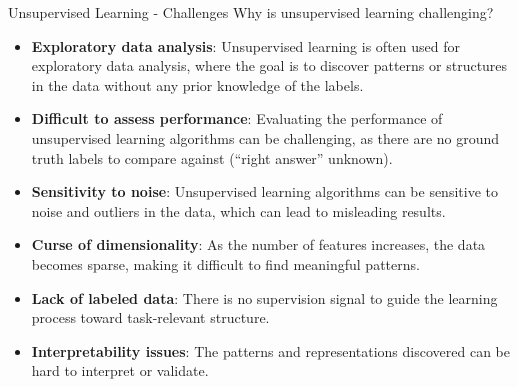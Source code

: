 \begin{frame}[allowframebreaks]{Unsupervised Learning - Challenges}
    Why is unsupervised learning challenging?
    \begin{itemize}
        \item \textbf{Exploratory data analysis}: Unsupervised learning is often used for exploratory data analysis, where the goal is to discover patterns or structures in the data without any prior knowledge of the labels.
        \item \textbf{Difficult to assess performance}: Evaluating the performance of unsupervised learning algorithms can be challenging, as there are no ground truth labels to compare against (``right answer'' unknown).
        \item \textbf{Sensitivity to noise}: Unsupervised learning algorithms can be sensitive to noise and outliers in the data, which can lead to misleading results.
        \item \textbf{Curse of dimensionality}: As the number of features increases, the data becomes sparse, making it difficult to find meaningful patterns.
        \item \textbf{Lack of labeled data}: There is no supervision signal to guide the learning process toward task-relevant structure.
        \item \textbf{Interpretability issues}: The patterns and representations discovered can be hard to interpret or validate.
    \end{itemize}
\end{frame}